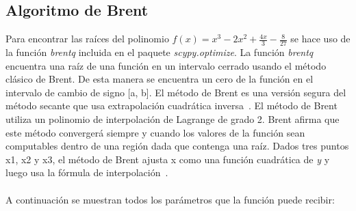 \documentclass{article}
\begin{document}
\subsection{Algoritmo de Brent}
Para encontrar las raíces del polinomio \(f(x)=x^3-2x^2+\frac{4x}{3}-\frac{8}{27}\) se hace uso de la función \emph{brentq} incluida en el paquete \emph{scypy.optimize}. La función \emph{brentq} encuentra una raíz de una función en un intervalo cerrado usando el método clásico de Brent. De esta manera se encuentra un cero de la función en el intervalo de cambio de signo [a, b]. El método  de Brent es una versión segura del método secante que usa extrapolación cuadrática inversa~\cite{SciPy}. El método de Brent utiliza un polinomio de interpolación de Lagrange de grado 2. Brent afirma que este método convergerá siempre y cuando los valores de la función sean computables dentro de una región dada que contenga una raíz. Dados tres puntos x1, x2 y x3, el método de Brent ajusta x como una función cuadrática de \emph{y} y luego usa la fórmula de interpolación~\cite{Wolfram}.\\\\
A continuación se muestran todos los parámetros que la función puede recibir:
\end{document}
